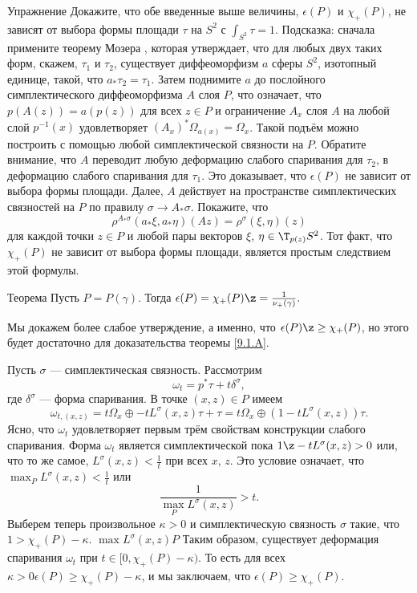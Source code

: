\begin{thm*}{Упражнение}
Докажите, что обе введенные выше величины, $\epsilon(P)$ и $\chi_+ (P)$, не зависят от выбора формы площади $\tau$ на $S^2$ с $\int_{S^2} \tau = 1$.
Подсказка: сначала примените теорему Мозера \cite{MS}, которая утверждает, что для любых двух таких форм, скажем, $\tau_1$ и $\tau_2$, существует диффеоморфизм $a$ сферы $S^2$, изотопный единице, такой, что $a_\ast \tau_2 = \tau_1$.
Затем поднимите $a$ до послойного симплектического диффеоморфизма $A$ слоя $P$, что означает, что $p(A(z)) = a(p(z))$ для всех $z \in P$ и ограничение $A_x$ слоя $A$ на любой слой $p^{-1} ( x)$ удовлетворяет $(A_x)^\ast \Omega_{a(x)} = \Omega_x$.
Такой подъём можно построить с помощью любой симплектической связности на $P$.
Обратите внимание, что $A$ переводит любую деформацию слабого спаривания для $\tau_2$, в деформацию слабого спаривания для $\tau_1$.
Это доказывает, что $\epsilon(P)$ не зависит от выбора формы площади.
Далее, $A$ действует на пространстве симплектических связностей на $P$ по правилу $\sigma \to A_\ast \sigma$.
Покажите, что 
\[\rho^{A_\ast \sigma} (a_\ast \xi, a_\ast \eta)(Az) = \rho^\sigma (\xi, \eta)(z)\]
для каждой точки $z \in P$ и любой пары векторов $\xi$, $\eta \in \T_{p(z)} S^2$.
Тот факт, что $\chi_+(P)$ не зависит от выбора формы площади, является простым следствием этой формулы.
\end{thm*}

\begin{thm}[(\cite{P4})]{Теорема}\label{9.3.B}
Пусть $P = P(\gamma)$.
Тогда $\epsilon(P) = \chi_+ (P) \z= \frac1{\nu_+(\gamma)}.$
\end{thm}

Мы докажем более слабое утверждение, а именно, что $\epsilon(P) \z\ge \chi_+ (P)$, но этого будет достаточно для доказательства теоремы \ref{9.1.A}.

Пусть $\sigma$ --- симплектическая связность.
Рассмотрим 
\[\omega_t = p^\ast \tau + t\delta^\sigma,\]
где $\delta^\sigma$ --- форма спаривания.
В точке $(x, z) \in P$ имеем 
\[\omega_{t,(x,z)} = t\Omega_x \oplus -tL^\sigma (x, z)\tau + \tau = t\Omega_x \oplus (1 - tL^\sigma (x, z))\tau.\]
Ясно, что $\omega_t$ удовлетворяет первым трём свойствам конструкции слабого спаривания.
Форма $\omega_t$ является симплектической пока $1 \z- tL^\sigma (x, z) > 0$ или, что то же самое, $L^\sigma (x, z) < \frac1t$ при всех $x$, $z$.
Это условие означает, что 
$\max_P L^\sigma (x, z) < \frac1t$
или 
\[\frac1{\max_P L^\sigma (x, z)} > t.\]
Выберем теперь произвольное $\kappa > 0$ и симплектическую связность $\sigma$ такие, что $1 > \chi_+ (P) - \kappa$.
$\max L^\sigma (x, z) P$ 
Таким образом, существует деформация спаривания $\omega_t$ при $t \in [0, \chi_+ (P) - \kappa)$.
То есть для всех $\kappa > 0 \epsilon(P) \ge \chi_+ (P) - \kappa$, и мы заключаем, что $\epsilon(P) \ge \chi_+ (P)$.

